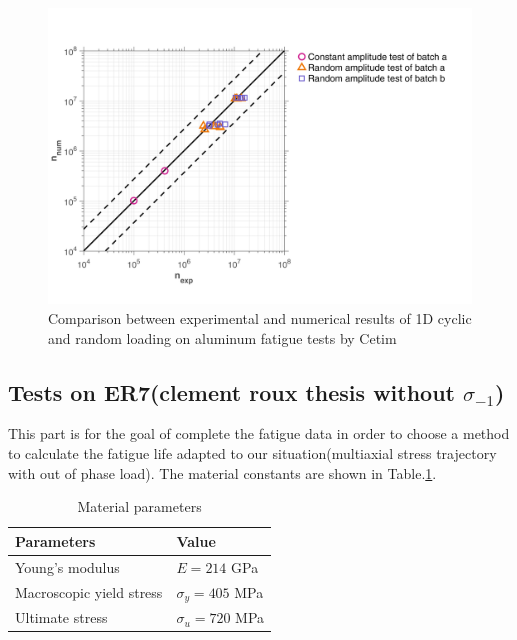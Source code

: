 \documentclass[3p,times,number,review]{elsarticle}
\begin{document}
\begin{figure}[!h]
	\centering
	\includegraphics[width=\textwidth]{figures//Cetim_err.png} 
	\caption{Comparison between experimental and numerical results of 1D cyclic and random loading on aluminum fatigue tests by Cetim}
	\label{fig.Cetimerr}
\end{figure}


\subsection{Tests on ER7(clement roux thesis without $\sigma_{-1}$)}
This part is for the goal of complete the fatigue data in order to choose a method to calculate the fatigue life adapted to our situation(multiaxial stress trajectory with out of phase load). The material constants are shown in Table.\ref{tab:ER7}.
\begin{table}[!h]
	\centering
	\begin{tabular}{ll}
		\hline
		\textbf{Parameters}                                       & \textbf{Value}                    \\ \hline
		Young's modulus                                          & $E=214$ GPa                       \\
		Macroscopic yield stress                              & $\sigma_y=405$ MPa              \\
		Ultimate stress                  & $\sigma_u=720$ MPa                        \\ \hline
	\end{tabular}
	\caption{Material parameters}
	\label{tab:ER7}
\end{table}
\end{document}
